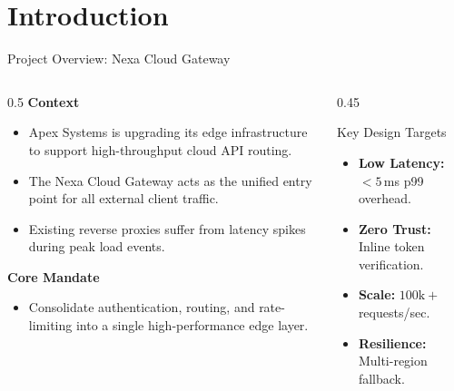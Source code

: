 
\section{Introduction}

\begin{frame}{Project Overview: Nexa Cloud Gateway}
  \begin{columns}[T]
    \begin{column}{0.5\textwidth}
      \textbf{Context}
      \begin{itemize}
        \item Apex Systems is upgrading its edge infrastructure to support high-throughput cloud API routing.
        \item The Nexa Cloud Gateway acts as the unified entry point for all external client traffic.
        \item Existing reverse proxies suffer from latency spikes during peak load events.
      \end{itemize}
      \vspace{0.3cm}
      \textbf{Core Mandate}
      \begin{itemize}
        \item Consolidate authentication, routing, and rate-limiting into a single high-performance edge layer.
      \end{itemize}
    \end{column}
    
    \begin{column}{0.45\textwidth}
      \begin{designcard}{Key Design Targets}
        \begin{itemize}
          \item[\faClock] \textbf{Low Latency:} $<5$\,ms p99 overhead.
          \item[\faLock] \textbf{Zero Trust:} Inline token verification.
          \item[\faChartLine] \textbf{Scale:} $100\text{k}+$ requests/sec.
          \item[\faServer] \textbf{Resilience:} Multi-region fallback.
        \end{itemize}
      \end{designcard}
    \end{column}
  \end{columns}
\end{frame}

